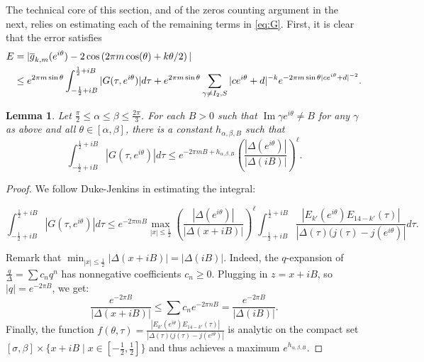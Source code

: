 \documentclass[12pt]{amsart}
\theoremstyle{plain} %
\newtheorem{lemma}      [theorem]{Lemma}
\theoremstyle{definition}
\theoremstyle{remark}
\numberwithin{equation}{section}
\renewcommand{\Im}{\operatorname{Im}}
\begin{document}
The technical core of this section, and of the zeros counting argument in the next, relies on estimating each of the remaining terms in \eqref{eq:G}. First, it is clear that the error satisfies
\begin{align*}
E &=|\overline{g}_{k,m}(e^{i\theta})-2\cos\left(2\pi m\cos
(\theta)+k\theta/2\right)| \notag \\
& \leq e^{2\pi m\sin\theta}\int_{-\frac{1}{2}+iB}^{\frac{1}{2}+iB}|G(\tau,e^{i\theta})|d\tau+e^{2\pi m\sin\theta}\sum_{\gamma\neq I_2,S}|ce^{i\theta}+d|^{-k}
e^{-2\pi  m \sin\theta|ce^{i\theta}+d|^{-2}}.
\end{align*}


\begin{lemma}\label{l:IB}
Let $\frac{\pi}{2}\leq \alpha\leq \beta \leq\frac{2\pi}{3}$. 
For each $B>0$ such that $\Im \gamma e^{i\theta}\neq B$ for any $\gamma$ as above and all $\theta\in [\alpha,\beta]$, there is a constant $h_{\alpha,\beta,B}$ such that
\[\int_{-\frac{1}{2}+iB}^{\frac{1}{2}+iB}|G(\tau,e^{i\theta})|d\tau\leq e^{-2\pi m B+h_{\alpha,\beta,B}}\left(\frac{|\Delta(e^{i\theta})|}{|\Delta(iB)|}\right)^\ell .\]
\end{lemma}
\begin{proof}
We follow Duke-Jenkins in estimating the integral:

\[\int_{-\frac{1}{2}+iB}^{\frac{1}{2}+iB}|G(\tau,e^{i\theta})|d\tau\leq e^{-2\pi m B}\max_{|x|\leq \frac{1}{2}}\left(\frac{|\Delta(e^{i\theta})|}{|\Delta(x+iB)|}\right)^\ell \int_{-\frac{1}{2}+iB}^{\frac{1}{2}+iB}\frac{|E_{k'}(e^{i\theta})E_{14-k'}(\tau)|}{|\Delta(\tau)(j(\tau)-j(e^{i\theta})|}d\tau.\]

Remark that $\min_{|x|\leq
  \frac{1}{2}}|\Delta(x+iB)|=|\Delta(iB)|$. Indeed, the
$q$-expansion of $\frac{q}{\Delta}=\sum c_nq^n$ has nonnegative
coefficients $c_n\geq 0$. Plugging in $z=x+iB$, so $|q|=e^{-2\pi B}$, we get: 
\[\frac{e^{-2\pi B}}{|\Delta(x+iB)|}\leq \sum c_n e^{-2\pi
  nB}=\frac{e^{-2\pi B}}{|\Delta(iB)|}.\]
Finally, the function $f(\theta,\tau)=\frac{|E_{k'}(e^{i\theta})E_{14-k'}(\tau)|}{|\Delta(\tau)(j(\tau)-j(e^{i\theta})|}$ is analytic on the compact set $[\sigma,\beta]\times \{x+iB\mid x\in [-\frac{1}{2},\frac{1}{2}]\}$ and thus achieves a maximum $e^{h_{\alpha,\beta,B}}$.
\end{proof}
\end{document}
